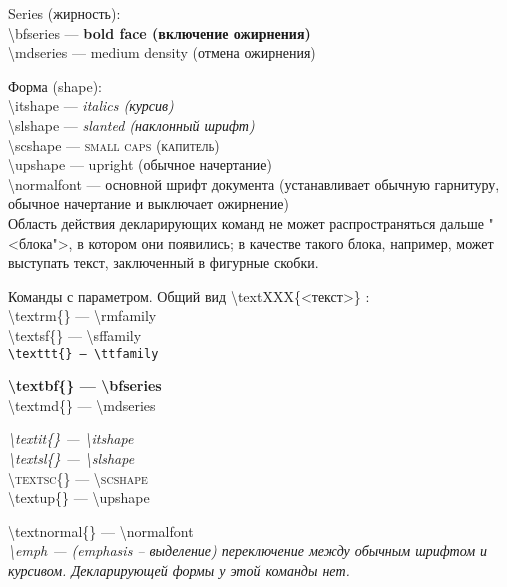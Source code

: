 \noindent
Series (жирность):\\
\textbackslash bfseries --- {\bfseries bold face (включение ожирнения)}  \\
\textbackslash mdseries --- {\mdseries medium density (отмена ожирнения)}
\medskip

\noindent
Форма (shape):                                                    \\
\textbackslash itshape --- {\itshape italics (курсив)}            \\
\textbackslash slshape --- {\slshape slanted (наклонный шрифт)}   \\
\textbackslash scshape --- {\scshape small caps (капитель)}       \\
\textbackslash upshape --- {\upshape upright (обычное начертание)}\\
\textbackslash normalfont --- {\normalfont основной шрифт документа (устанавливает обычную гарнитуру, обычное начертание и выключает ожирнение)}\\
Область действия декларирующих команд не может распространяться дальше "<блока">, в котором они появились; в качестве такого блока, например, может выступать текст, заключенный в фигурные скобки.
\medskip

\noindent
Команды с параметром. Общий вид {\ttfamily \textbackslash textXXX\{<текст>\}} :\\
\textrm{\textbackslash textrm\{\} --- \textbackslash rmfamily}\\
\textsf{\textbackslash textsf\{\} --- \textbackslash sffamily}\\
\texttt{\textbackslash texttt\{\} --- \textbackslash ttfamily}
\medskip

\noindent
\textbf{\textbackslash textbf\{\} --- \textbackslash bfseries}\\
\textmd{\textbackslash textmd\{\} --- \textbackslash mdseries}
\medskip

\noindent
\textit{\textbackslash textit\{\} --- \textbackslash itshape}\\
\textsl{\textbackslash textsl\{\} --- \textbackslash slshape}\\
\textsc{\textbackslash textsc\{\} --- \textbackslash scshape}\\
\textup{\textbackslash textup\{\} --- \textbackslash upshape}
\medskip

\noindent
\textnormal{\textbackslash textnormal\{\} --- \textbackslash normalfont} \\
\emph{\textbackslash emph --- (emphasis -- выделение) переключение между обычным шрифтом и курсивом. Декларирующей формы у этой команды нет.}
\medskip

